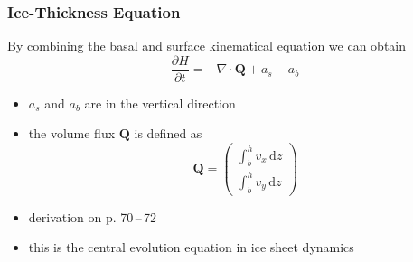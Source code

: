 \documentclass[hide notes,intlimits]{beamer}
\begin{document}
\begin{frame}
  \frametitle{Ice-Thickness Equation}
  By combining the basal and surface kinematical equation we can obtain
  \begin{equation}
    \frac{\partial H}{\partial t} = - \nabla \cdot \mathbf{Q} + a_{s} - a_{b}
  \end{equation}
    \begin{itemize}
    \item $ a_{s}$ and $a_{b}$ are in the vertical direction
    \item the volume flux $\mathbf{Q}$ is defined as
      \begin{equation*}
        \mathbf{Q} =
        \left(
          \begin{array}{c}
            \int_{b}^{h} v_{x} \,\text{d} z \\[.25em]
          \int_{b}^{h} v_{y} \,\text{d} z
        \end{array}
      \right)
    \end{equation*}
  \item derivation on p. 70\,--\,72
  \item this is the central evolution equation in ice sheet dynamics
  \end{itemize}
\end{frame}
\end{document}

